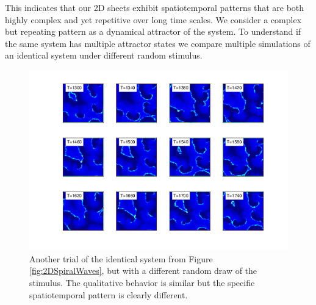 \documentclass[12pt]{article}
\begin{document}
This indicates that our 2D sheets exhibit spatiotemporal patterns that are both highly complex and yet repetitive over long time scales.
We consider a complex but repeating pattern as a dynamical attractor of the system.
To understand if the same system has multiple attractor states we compare multiple simulations of an identical system under different random stimulus.
\begin{figure}[!htb]
 \caption{ Another trial of the identical system from Figure \ref{fig:2DSpiralWaves}, but with a different random draw of the stimulus.
           The qualitative behavior is similar but the specific spatiotemporal pattern is clearly different.}
 \label{fig:2DSpiralWaves_SecondTrial}
 \centering
   \includegraphics[width=\textwidth]{fig/SpiralWaves2D_K6_kappa0p1_M4_SecondTrial}
\end{figure}
\FloatBarrier
\end{document}
